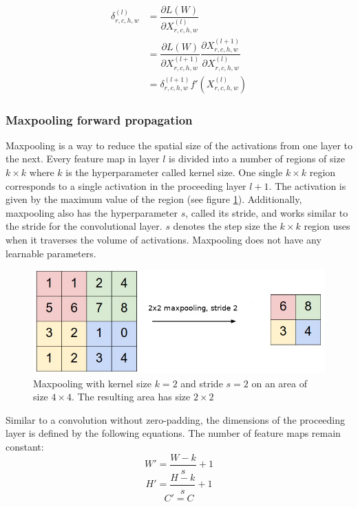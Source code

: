 \documentclass[a4paper,11pt,twoside]{article}
\newcommand*{\pd}[2]{\ensuremath{\dfrac{\partial #1}{\partial #2}}}
\begin{document}
\begin{equation}
\begin{split}
\delta^{(l)}_{r,c,h,w}
		& = \pd{L(W)}{X^{(l)}_{r,c,h,w}} \\
		& = \pd{L(W)}{X^{(l+1)}_{r,c,h,w}} \pd{X^{(l+1)}_{r,c,h,w}}{X^{(l)}_{r,c,h,w}} \\
		& = \delta^{(l+1)}_{r,c,h,w} f'(X^{(l)}_{r,c,h,w})
\end{split}
\end{equation}

\subsubsection{Maxpooling forward propagation}
Maxpooling is a way to reduce the spatial size of the activations from one layer to the next. Every feature map in layer $l$ is divided into a number of regions of size $k \times k$ where $k$ is the hyperparameter called kernel size. One single $k \times k$ region corresponds to a single activation in the proceeding layer $l+1$. The activation is given by the maximum value of the region (see figure \ref{figmaxpool}). Additionally, maxpooling also has the hyperparameter $s$, called its stride, and works similar to the stride for the convolutional layer. $s$ denotes the step size the $k \times k$ region uses when it traverses the volume of activations. Maxpooling does not have any learnable parameters. \cite{cs231n} \cite{convmath} \cite{convarithmetic}

\begin{figure}[h]
	\centering
  		\includegraphics[scale=0.7]{maxpool.png}
  	\caption{Maxpooling with kernel size $k=2$ and stride $s=2$ on an area of size $4 \times 4$. The resulting area has size $2 \times 2$} \label{figmaxpool}
\end{figure}

Similar to a convolution without zero-padding, the dimensions of the proceeding layer is defined by the following equations. The number of feature maps remain constant: \cite{cs231n} \cite{convmath} \cite{convarithmetic}
\begin{equation}
W' = \frac{W-k}{s}+1
\end{equation}
\begin{equation}
H' = \frac{H-k}{s}+1
\end{equation}
\begin{equation}
C' = C
\end{equation}
\end{document}
